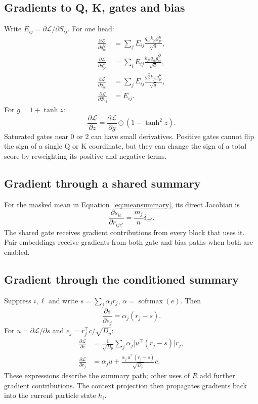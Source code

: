 \documentclass[11pt,a4paper]{article}
\newcommand{\softmax}{\operatorname{softmax}}
\newcommand{\Had}{\odot}
\numberwithin{equation}{section}
\begin{document}
\subsection{Gradients to Q, K, gates and bias}
Write $E_{ij}=\partial\mathcal L/\partial S_{ij}$. For one head:
\begin{align}
 \frac{\partial\mathcal L}{\partial g^Q_{ic}}
 &=\sum_j E_{ij}\frac{q_{ic}k_{jc}g^K_{jc}}{\sqrt d},\\
 \frac{\partial\mathcal L}{\partial g^K_{jc}}
 &=\sum_i E_{ij}\frac{k_{jc}q_{ic}g^Q_{ic}}{\sqrt d},\\
 \frac{\partial\mathcal L}{\partial q_{ic}}
 &=\sum_j E_{ij}\frac{g^Q_{ic}k_{jc}g^K_{jc}}{\sqrt d},\\
 \frac{\partial\mathcal L}{\partial\mathcal B_{ij}}
 &=E_{ij}.
\end{align}
For $g=1+\tanh z$:
\[
 \frac{\partial\mathcal L}{\partial z}
 =\frac{\partial\mathcal L}{\partial g}\Had(1-\tanh^2z).
\]
Saturated gates near 0 or 2 can have small derivatives. Positive gates
cannot flip the sign of a single Q or K coordinate, but they can change
the sign of a total score by reweighting its positive and negative terms.

\subsection{Gradient through a shared summary}
For the masked mean in Equation~\eqref{eq:meansummary}, its direct
Jacobian is
\[
 \frac{\partial s_{ic}}{\partial r_{ijc'}}=
 \frac{m_j}{n}\delta_{cc'}.
\]
The shared gate receives gradient contributions from every block that uses
it. Pair embeddings receive gradients from both gate and bias paths when
both are enabled.

\subsection{Gradient through the conditioned summary}
Suppress $i,\ell$ and write $s=\sum_j\alpha_jr_j$,
$\alpha=\softmax(e)$. Then
\[
 \frac{\partial s}{\partial e_j}=\alpha_j(r_j-s).
\]
For $u=\partial\mathcal L/\partial s$ and
$e_j=r_j^\top c/\sqrt{D_p}$:
\begin{align}
 \frac{\partial\mathcal L}{\partial c}
 &=\frac1{\sqrt{D_p}}\sum_j
       \alpha_j\big[u^\top(r_j-s)\big]r_j,\\
 \frac{\partial\mathcal L}{\partial r_j}
 &=\alpha_j u+
   \frac{\alpha_j\,u^\top(r_j-s)}{\sqrt{D_p}}c .
\end{align}
These expressions describe the summary path; other uses of $R$ add further
gradient contributions. The context projection then propagates gradients
back into the current particle state $h_i$.
\end{document}
